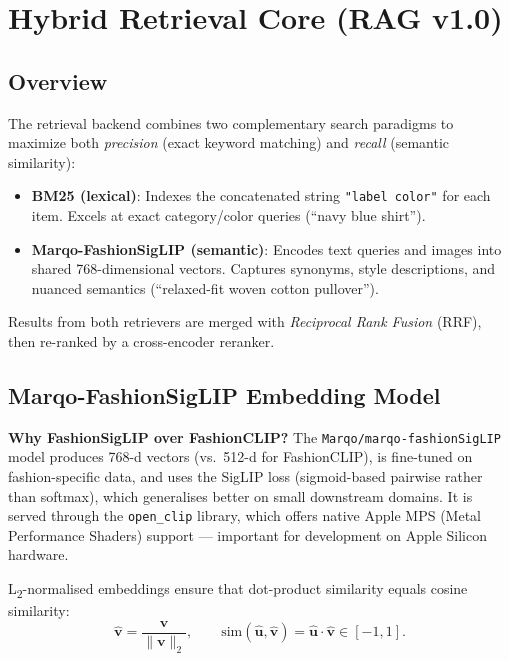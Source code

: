 \documentclass[12pt,a4paper]{article}
\begin{document}
\section{Hybrid Retrieval Core (RAG v1.0)}
\label{sec:rag}

\subsection{Overview}

The retrieval backend combines two complementary search paradigms
to maximize both \emph{precision} (exact keyword matching) and
\emph{recall} (semantic similarity):

\begin{itemize}
  \item \textbf{BM25 (lexical)}: Indexes the concatenated string
    \texttt{"\textlangle label\textrangle\ \textlangle color\textrangle"} for each item.
    Excels at exact category/color queries
    (``navy blue shirt'').
  \item \textbf{Marqo-FashionSigLIP (semantic)}: Encodes text queries and images
    into shared 768-dimensional vectors.
    Captures synonyms, style descriptions, and nuanced semantics
    (``relaxed-fit woven cotton pullover'').
\end{itemize}

Results from both retrievers are merged with
\emph{Reciprocal Rank Fusion} (RRF), then re-ranked by a
cross-encoder reranker.

\subsection{Marqo-FashionSigLIP Embedding Model}

\textbf{Why FashionSigLIP over FashionCLIP?}
The \texttt{Marqo/marqo-fashionSigLIP} model produces 768-d vectors
(vs.\ 512-d for FashionCLIP), is fine-tuned on fashion-specific data,
and uses the SigLIP loss (sigmoid-based pairwise rather than softmax),
which generalises better on small downstream domains.
It is served through the \texttt{open\_clip} library, which offers
native Apple MPS (Metal Performance Shaders) support --- important
for development on Apple Silicon hardware.

L\textsubscript{2}-normalised embeddings ensure that dot-product
similarity equals cosine similarity:
\[
  \hat{\mathbf{v}} = \frac{\mathbf{v}}{\|\mathbf{v}\|_2},
  \qquad
  \text{sim}(\hat{\mathbf{u}}, \hat{\mathbf{v}}) =
  \hat{\mathbf{u}} \cdot \hat{\mathbf{v}} \in [-1, 1].
\]
\end{document}
